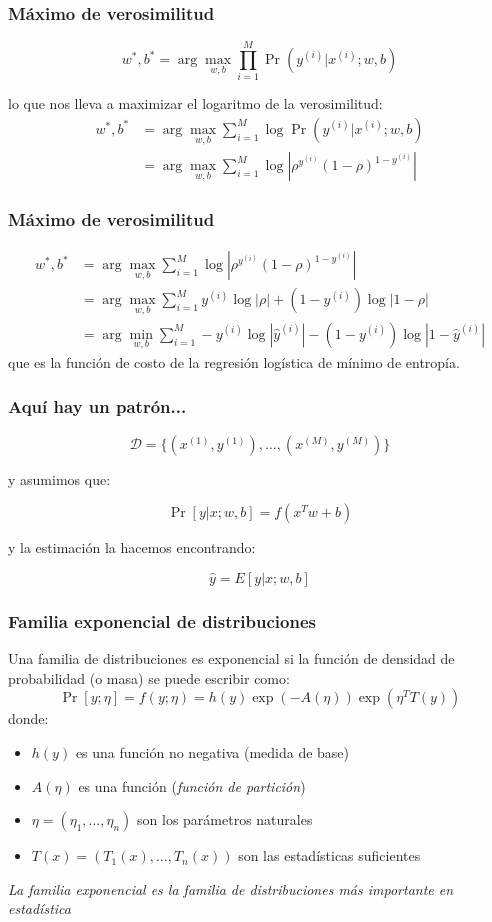 \documentclass{beamer}
\begin{document}
\begin{frame}
  \frametitle{Máximo de verosimilitud}
  $$
  w^*, b^* = \arg \max_{w, b} \prod_{i=1}^M \Pr(y^{(i)} | x^{(i)}; w, b)
  $$

  lo que nos lleva a maximizar el logaritmo de la verosimilitud:
  \begin{align*}
    w^*, b^* &= \arg \max_{w, b} \sum_{i=1}^M \log \Pr(y^{(i)} | x^{(i)}; w, b) \\
    &= \arg \max_{w, b} \sum_{i=1}^M \log \left|\rho^{y^{(i)}} (1 - \rho)^{1 - y^{(i)}}\right| 
  \end{align*}
\end{frame}

\begin{frame}
  \frametitle{Máximo de verosimilitud}
  \begin{align*}
    w^*, b^* &= \arg \max_{w, b} \sum_{i=1}^M \log \left|\rho^{y^{(i)}} (1 - \rho)^{1 - y^{(i)}}\right| \\
    &= \arg \max_{w, b} \sum_{i=1}^M y^{(i)} \log|\rho| + (1 - y^{(i)}) \log|1 - \rho| \\
    &= \arg \min_{w, b} \sum_{i=1}^M -y^{(i)} \log|\hat{y}^{(i)}| - (1 - y^{(i)}) \log|1 - \hat{y}^{(i)}| 
  \end{align*}
  que es la función de costo de la regresión logística de mínimo de entropía.
\end{frame}

\begin{frame}
  \frametitle{Aquí hay un patrón...}

  $$  
  \mathcal{D} = \{(x^{(1)}, y^{(1)}), \ldots, (x^{(M)}, y^{(M)})\} 
  $$
    
  y asumimos que:
  
  $$
  \Pr[y | x; w, b] = f(x^T w + b)
  $$

  y la estimación la hacemos encontrando:

  $$
  \hat{y} = E[y | x; w, b]
  $$
\end{frame}

\begin{frame}
  \frametitle{Familia exponencial de distribuciones}

  Una familia de distribuciones es exponencial si la función de densidad de probabilidad (o masa) se puede escribir como:
  $$
  \Pr[y; \eta] = f(y; \eta) = h(y) \exp(-A(\eta)) \exp(\eta^T T(y))
  $$
  donde:
  \begin{itemize}
    \item $h(y)$ es una función no negativa (medida de base)
    \item $A(\eta)$ es una función (\emph{función de partición})
    \item $\eta = (\eta_1, \ldots, \eta_n)$ son los parámetros naturales
    \item $T(x) = (T_1(x), \ldots, T_n(x))$ son las estadísticas suficientes
  \end{itemize}

  \begin{block}{}
    \emph{La familia exponencial es la familia de distribuciones más importante en estadística}
  \end{block}
\end{frame}
\end{document}
